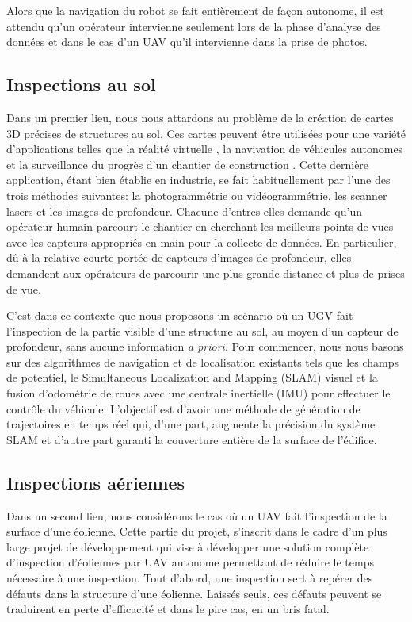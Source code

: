 Alors que la navigation du robot se fait entièrement de façon autonome, il est attendu qu'un opérateur intervienne seulement lors de la phase d'analyse des données et dans le cas d'un UAV qu'il intervienne dans la prise de photos.

\subsection{Inspections au sol}
Dans un premier lieu, nous nous attardons au problème de la création de cartes 3D précises de structures au sol. Ces cartes peuvent être utilisées pour une variété d'applications telles que la réalité virtuelle \citep{googlevr2017}, la navivation de véhicules autonomes \citep{deepmap2017} et la surveillance du progrès d'un chantier de construction \citep{Omar2018}. Cette dernière application, étant bien établie en industrie, se fait habituellement par l'une des trois méthodes suivantes: la photogrammétrie ou vidéogrammétrie, les scanner lasers et les images de profondeur. Chacune d'entres elles demande qu'un opérateur humain parcourt le chantier en cherchant les meilleurs points de vues avec les capteurs appropriés en main pour la collecte de données. En particulier, dû à la relative courte portée de capteurs d'images de profondeur, elles demandent aux opérateurs de parcourir une plus grande distance et plus de prises de vue.

C'est dans ce contexte que nous proposons un scénario où un UGV fait l'inspection de la partie visible d'une structure au sol, au moyen d'un capteur de profondeur, sans aucune information \textit{a priori}. Pour commencer, nous nous basons sur des algorithmes de navigation et de localisation existants tels que les champs de potentiel, le Simultaneous Localization and Mapping (SLAM) visuel et la fusion d'odométrie de roues avec une centrale inertielle (IMU) pour effectuer le contrôle du véhicule. L'objectif est d'avoir une méthode de génération de trajectoires en temps réel qui, d'une part, augmente la précision du système SLAM et d'autre part garanti la couverture entière de la surface de l'édifice.

\subsection{Inspections aériennes}
Dans un second lieu, nous considérons le cas où un UAV fait l'inspection de la surface d'une éolienne. Cette partie du projet,
s'inscrit dans le cadre d'un plus large projet de développement qui vise à développer une solution complète d'inspection d'éoliennes par UAV autonome permettant de réduire le temps nécessaire à une inspection. Tout d'abord, une inspection sert à repérer des défauts dans la structure d'une éolienne. Laissés seuls, ces défauts peuvent se traduirent en perte d'efficacité et dans le pire cas, en un bris fatal.


